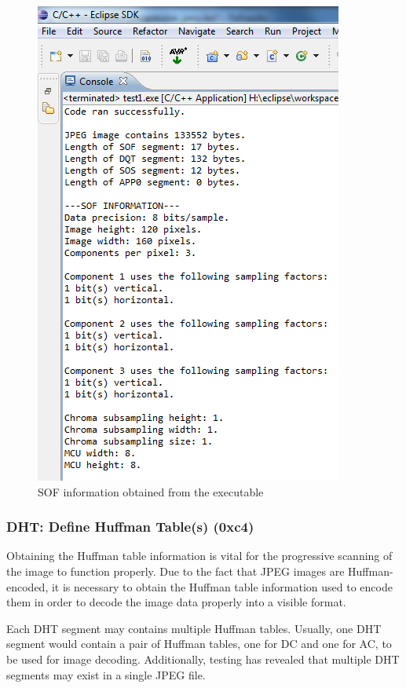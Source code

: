 \begin{figure}[!hbtp]
\begin{center}
\includegraphics[scale=1]{figures/SOFOutput.png} 
\end{center}
\caption{SOF information obtained from the executable}
\end{figure}

\newpage
\subsubsection{DHT: Define Huffman Table(s) (0xc4)}

Obtaining the Huffman table information is vital for the
progressive scanning of the image to function properly.
Due to the fact that JPEG images are Huffman-encoded,
it is necessary to obtain the Huffman table information
used to encode them in order to decode the image
data properly into a visible format.

Each DHT segment may contains multiple Huffman tables.
Usually, one DHT segment would contain a pair of Huffman 
tables, one for DC and one for AC, to be used for image
decoding. Additionally, testing has revealed that 
multiple DHT segments may exist in a single JPEG file.

